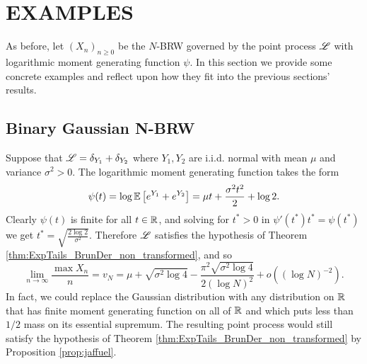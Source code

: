 \section{EXAMPLES}\label{sec:examples}
As before, let $(X_n)_{n \geq 0}$ be the $N$-BRW governed by the point process $\mathscr{L}$ with logarithmic moment generating function $\psi$. In this section we provide some concrete examples and reflect upon how they fit into the previous sections' results. 







\subsection{Binary Gaussian N-BRW}\label{subsec:examples_gaussian_BRW}
Suppose that $\mathscr{L} = \delta_{Y_1} + \delta_{Y_2}$ where $Y_1, Y_2$ are i.i.d. normal with mean $\mu$ and variance $\sigma^2 > 0$. The logarithmic moment generating function takes the form
\begin{equation}\nonumber
\psi(t) = \log \mathbb{E}\left[ e^{Y_1} + e^{Y_2} \right] = \mu t + \frac{\sigma^2 t^2}{2} + \log 2. 
\end{equation}
Clearly $\psi(t)$ is finite for all $t \in \mathbb{R}$, and solving for $t^* > 0$ in $\psi'(t^*) t^* = \psi(t^*)$ we get $t^* = \sqrt{\frac{2 \log 2}{\sigma^2}}$. Therefore $\mathscr{L}$ satisfies the hypothesis of Theorem \ref{thm:ExpTails_BrunDer_non_transformed}, and so 
\begin{equation}\nonumber
\lim\limits_{n \to \infty} \frac{\max X_n}{n} = v_N = \mu + \sqrt{\sigma^2 \log 4} - \frac{\pi^2 \sqrt{\sigma^2 \log 4}}{2 (\log N)^2} + o((\log N)^{-2}). 
\end{equation}
In fact, we could replace the Gaussian distribution with any distribution on $\mathbb{R}$ that has finite moment generating function on all of $\mathbb{R}$ and which puts less than $1/2$ mass on its essential supremum. The resulting point process would still satisfy the hypothesis of Theorem \ref{thm:ExpTails_BrunDer_non_transformed} by Proposition \ref{prop:jaffuel}. \\





